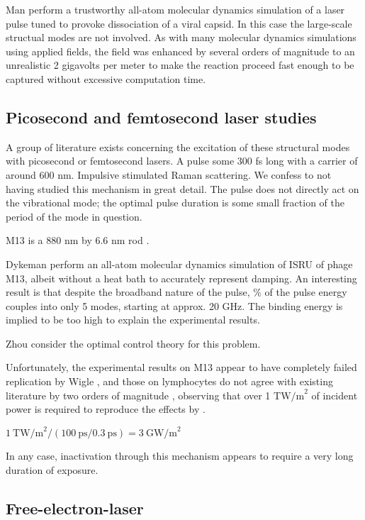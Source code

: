 \documentclass[paper.tex]{subfiles}
\begin{document}
\begin{multicols}{1}
Man \cite{Picosecond2016b} perform a trustworthy all-atom molecular dynamics simulation of a laser pulse tuned to provoke dissociation of a viral capsid. In this case the large-scale structual modes are not involved. As with many molecular dynamics simulations using applied fields, the field was enhanced by several orders of magnitude to an unrealistic 2 gigavolts per meter to make the reaction proceed fast enough to be captured without excessive computation time.


\subsection{Picosecond and femtosecond laser studies}

A group of literature exists concerning the excitation of these structural modes with picosecond or femtosecond lasers. A pulse some 300 fs long with a carrier of around 600 nm. Impulsive stimulated Raman scattering. We confess to not having studied this mechanism in great detail. The pulse does not directly act on the vibrational mode; the optimal pulse duration is some small fraction of the period of the mode in question.

M13 is a 880 nm by 6.6 nm rod \cite{M132015}. 

Dykeman \cite{Vibrational2009} perform an all-atom molecular dynamics simulation of ISRU of phage M13, albeit without a heat bath to accurately represent damping. An interesting result is that despite the broadband nature of the pulse, \% of the pulse energy couples into only 5 modes, starting at approx. 20 GHz. The binding energy is implied to be too high to explain the experimental results. 

Zhou \cite{Maximum2010} consider the optimal control theory for this problem. 

Unfortunately, the experimental results on M13 appear to have completely failed replication by Wigle \cite{No2011}, and those on lymphocytes do not agree with existing literature by two orders of magnitude \cite{Targeted2002}, observing that over 1 T$\text{W/m}^2$ of incident power is required to reproduce the effects by . 

$1\ \text{TW/m}^2 / (100\ \text{ps} / 0.3\ \text{ps}) = 3\ \text{GW/m}^2$

In any case, inactivation through this mechanism appears to require a very long duration of exposure.




\subsection{Free-electron-laser }





\end{multicols}
\end{document}
